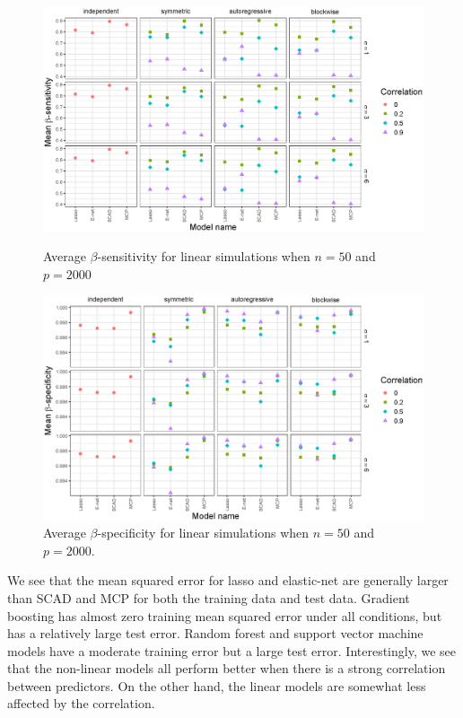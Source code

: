\documentclass{article}
\begin{document}
	\begin{figure}[h!]
		\centering	
		\includegraphics[width = \textwidth]{images/linear-facet/sensitivity/facet_sensitivity_1_50_2000.eps}
		\captionsetup{width = 0.8\textwidth}
		\caption{Average $\beta$-sensitivity for linear simulations when $n = 50$ and $p = 2000$}
		\label{fig:linear-sensitivity-50-2000}
		
		\bigskip
		
		\includegraphics[width = \textwidth]{images/linear-facet/specificity/facet_specificity_1_50_2000.eps}
		\captionsetup{width = 0.8\textwidth}
		\caption{Average $\beta$-specificity for linear simulations when $n = 50$ and $p = 2000$.}
		\label{fig:linear-specificity-50-2000}
	\end{figure}
	
	We see that the mean squared error for lasso and elastic-net are generally larger than SCAD and MCP for both the training data and test data. Gradient boosting has almost zero training mean squared error under all conditions, but has a relatively large test error. Random forest and support vector machine models have a moderate training error but a large test error. Interestingly, we see that the non-linear models all perform better when there is a strong correlation between predictors. On the other hand, the linear models are somewhat less affected by the correlation.
	
\end{document}
